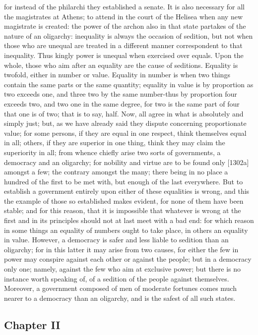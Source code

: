 \documentclass[12pt]{article}
\begin{document}
for instead of the philarchi they established a senate. It is also necessary for all the magistrates at Athens; to attend in the court of the Helisea when any new magistrate is created: the power of the archon also in that state partakes of the nature of an oligarchy: inequality is always the occasion of sedition, but not when those who are unequal are treated in a different manner correspondent to that inequality. Thus kingly power is unequal when exercised over equals. Upon the whole, those who aim after an equality are the cause of seditions. Equality is twofold, either in number or value. Equality in number is when two things contain the same parts or the same quantity; equality in value is by proportion as two exceeds one, and three two by the same number-thus by proportion four exceeds two, and two one in the same degree, for two is the same part of four that one is of two; that is to say, half. Now, all agree in what is absolutely and simply just; but, as we have already said they dispute concerning proportionate value; for some persons, if they are equal in one respect, think themselves equal in all; others, if they are superior in one thing, think they may claim the superiority in all; from whence chiefly arise two sorts of governments, a democracy and an oligarchy; for nobility and virtue are to be found only [1302a] amongst a few; the contrary amongst the many; there being in no place a hundred of the first to be met with, but enough of the last everywhere. But to establish a government entirely upon either of these equalities is wrong, and this the example of those so established makes evident, for none of them have been stable; and for this reason, that it is impossible that whatever is wrong at the first and in its principles should not at last meet with a bad end: for which reason in some things an equality of numbers ought to take place, in others an equality in value. However, a democracy is safer and less liable to sedition than an oligarchy; for in this latter it may arise from two causes, for either the few in power may conspire against each other or against the people; but in a democracy only one; namely, against the few who aim at exclusive power; but there is no instance worth speaking of, of a sedition of the people against themselves. Moreover, a government composed of men of moderate fortunes comes much nearer to a democracy than an oligarchy, and is the safest of all such states.

\subsection*{Chapter II}
\end{document}
